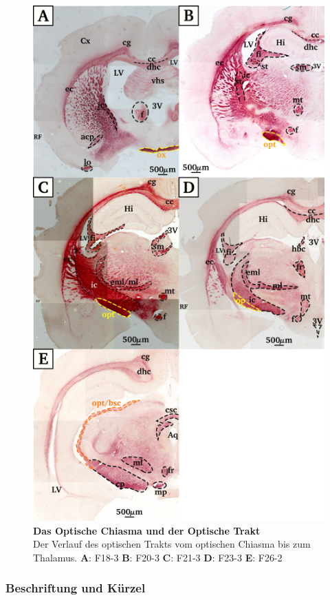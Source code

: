 \documentclass[12pt,a4paper,pdftex]{article}
\begin{document}
\begin{figure}[H]
    \centering
    \includegraphics{pictures/visual/optic_tract.png}
    \caption[Das Optische Chiasma und der Optische Trakt]{\textbf{Das Optische Chiasma und der Optische Trakt}\\
    Der Verlauf des optischen Trakts vom optischen Chiasma bis zum Thalamus. \textbf{A}: F18-3 \textbf{B}: F20-3 \textbf{C}: F21-3 \textbf{D}: F23-3 \textbf{E}: F26-2}
    \label{fig:optic_tract}
\end{figure}

\subsubsection*{Beschriftung und Kürzel}
\end{document}
